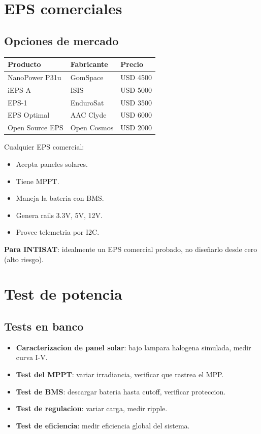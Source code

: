 \documentclass[11pt,a4paper,oneside,openright]{book}
\begin{document}
\chapter{EPS comerciales}

\section{Opciones de mercado}

\begin{center}
\begin{tabular}{p{4cm}p{4cm}p{2cm}}
\toprule
\textbf{Producto} & \textbf{Fabricante} & \textbf{Precio} \\
\midrule
NanoPower P31u           & GomSpace      & USD 4500 \\
iEPS-A                   & ISIS          & USD 5000 \\
EPS-1                    & EnduroSat     & USD 3500 \\
EPS Optimal              & AAC Clyde     & USD 6000 \\
Open Source EPS          & Open Cosmos   & USD 2000 \\
\bottomrule
\end{tabular}
\end{center}

Cualquier EPS comercial:
\begin{itemize}[leftmargin=2em]
  \item Acepta paneles solares.
  \item Tiene MPPT.
  \item Maneja la bateria con BMS.
  \item Genera rails 3.3V, 5V, 12V.
  \item Provee telemetria por I2C.
\end{itemize}

\textbf{Para INTISAT}: idealmente un EPS comercial probado, no diseñarlo
desde cero (alto riesgo).

\chapter{Test de potencia}

\section{Tests en banco}

\begin{itemize}[leftmargin=2em]
  \item \textbf{Caracterizacion de panel solar}: bajo lampara halogena
        simulada, medir curva I-V.
  \item \textbf{Test del MPPT}: variar irradiancia, verificar que
        rastrea el MPP.
  \item \textbf{Test de BMS}: descargar bateria hasta cutoff, verificar
        proteccion.
  \item \textbf{Test de regulacion}: variar carga, medir ripple.
  \item \textbf{Test de eficiencia}: medir eficiencia global del sistema.
\end{itemize}
\end{document}
